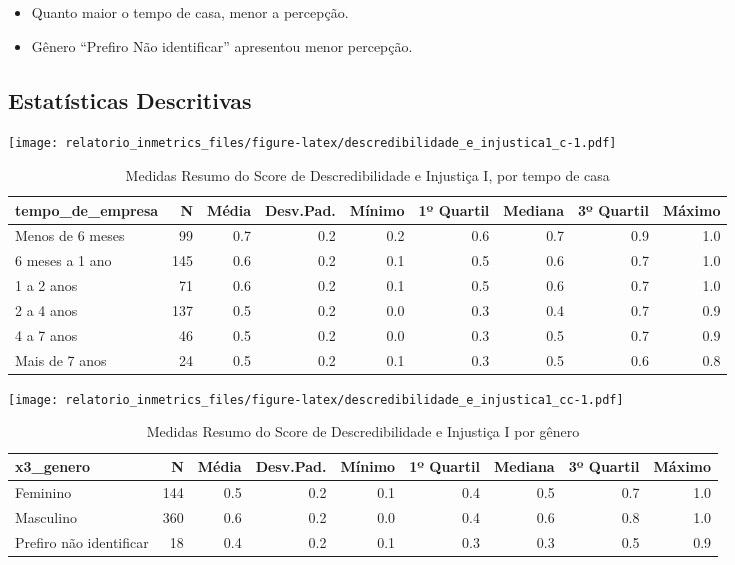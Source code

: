 \documentclass[]{book}
\providecommand{\tightlist}{%
  \setlength{\itemsep}{0pt}\setlength{\parskip}{0pt}}
\begin{document}
\begin{itemize}
\tightlist
\item
  Quanto maior o tempo de casa, menor a percepção.
\item
  Gênero ``Prefiro Não identificar'' apresentou menor percepção.
\end{itemize}

\hypertarget{estatisticas-descritivas}{%
\subsection{Estatísticas Descritivas}\label{estatisticas-descritivas}}

\texttt{[image: relatorio\_inmetrics\_files/figure-latex/descredibilidade\_e\_injustica1\_c-1.pdf]}

\begin{table}[t]

\caption{\label{tab:unnamed-chunk-12}Medidas Resumo do Score de Descredibilidade e Injustiça I, por tempo de casa}
\centering
\fontsize{7}{9}\selectfont
\begin{tabular}{lrrrrrrrr}
\toprule
tempo\_de\_empresa & N & Média & Desv.Pad. & Mínimo & 1º Quartil & Mediana & 3º Quartil & Máximo\\
\midrule
Menos de 6 meses & 99 & 0.7 & 0.2 & 0.2 & 0.6 & 0.7 & 0.9 & 1.0\\
6 meses a 1 ano & 145 & 0.6 & 0.2 & 0.1 & 0.5 & 0.6 & 0.7 & 1.0\\
1 a 2 anos & 71 & 0.6 & 0.2 & 0.1 & 0.5 & 0.6 & 0.7 & 1.0\\
2 a 4 anos & 137 & 0.5 & 0.2 & 0.0 & 0.3 & 0.4 & 0.7 & 0.9\\
4 a 7 anos & 46 & 0.5 & 0.2 & 0.0 & 0.3 & 0.5 & 0.7 & 0.9\\
\addlinespace
Mais de 7 anos & 24 & 0.5 & 0.2 & 0.1 & 0.3 & 0.5 & 0.6 & 0.8\\
\bottomrule
\end{tabular}
\end{table}

\texttt{[image: relatorio\_inmetrics\_files/figure-latex/descredibilidade\_e\_injustica1\_cc-1.pdf]}

\begin{table}[t]

\caption{\label{tab:unnamed-chunk-13}Medidas Resumo do Score de Descredibilidade e Injustiça I por gênero}
\centering
\fontsize{7}{9}\selectfont
\begin{tabular}{lrrrrrrrr}
\toprule
x3\_genero & N & Média & Desv.Pad. & Mínimo & 1º Quartil & Mediana & 3º Quartil & Máximo\\
\midrule
Feminino & 144 & 0.5 & 0.2 & 0.1 & 0.4 & 0.5 & 0.7 & 1.0\\
Masculino & 360 & 0.6 & 0.2 & 0.0 & 0.4 & 0.6 & 0.8 & 1.0\\
Prefiro não identificar & 18 & 0.4 & 0.2 & 0.1 & 0.3 & 0.3 & 0.5 & 0.9\\
\bottomrule
\end{tabular}
\end{table}
\end{document}
